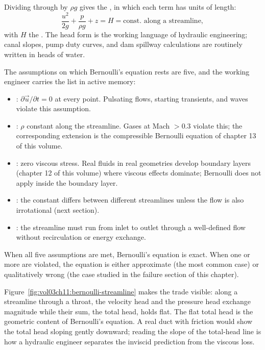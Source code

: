 Dividing through by $\rho g$ gives the , in
which each term has units of length:
\[
\frac{u^2}{2g} + \frac{p}{\rho g} + z = H = \text{const.\ along a
streamline},
\]
with $H$ the . The head form is the working
language of hydraulic engineering; canal slopes, pump duty curves,
and dam spillway calculations are routinely written in heads of
water.

The assumptions on which Bernoulli's equation rests are five, and
the working engineer carries the list in active memory:

\begin{itemize}[leftmargin=*]
  \item {}: $\partial\vec{u}/\partial t = 0$
    at every point. Pulsating flows, starting transients, and
    waves violate this assumption.
  \item {}: $\rho$ constant along the
    streamline. Gases at Mach $> 0.3$ violate this; the
    corresponding extension is the compressible Bernoulli equation
    of chapter 13 of this volume.
  \item {}: zero viscous stress. Real fluids in
    real geometries develop boundary layers (chapter 12 of this
    volume) where viscous effects dominate; Bernoulli does not
    apply inside the boundary layer.
  \item {}: the constant differs between
    different streamlines unless the flow is also irrotational
    (next section).
  \item {}:
    the streamline must run from inlet to outlet through a
    well-defined flow without recirculation or energy exchange.
\end{itemize}

When all five assumptions are met, Bernoulli's equation is exact.
When one or more are violated, the equation is either approximate
(the most common case) or qualitatively wrong (the case studied in
the failure section of this chapter).



Figure~\ref{fig:vol03ch11:bernoulli-streamline} makes the trade
visible: along a streamline through a throat, the velocity head and
the pressure head exchange magnitude while their sum, the total head,
holds flat. The flat total head is the geometric content of
Bernoulli's equation. A real duct with friction would show the total
head sloping gently downward; reading the slope of the total-head
line is how a hydraulic engineer separates the inviscid prediction
from the viscous loss.

